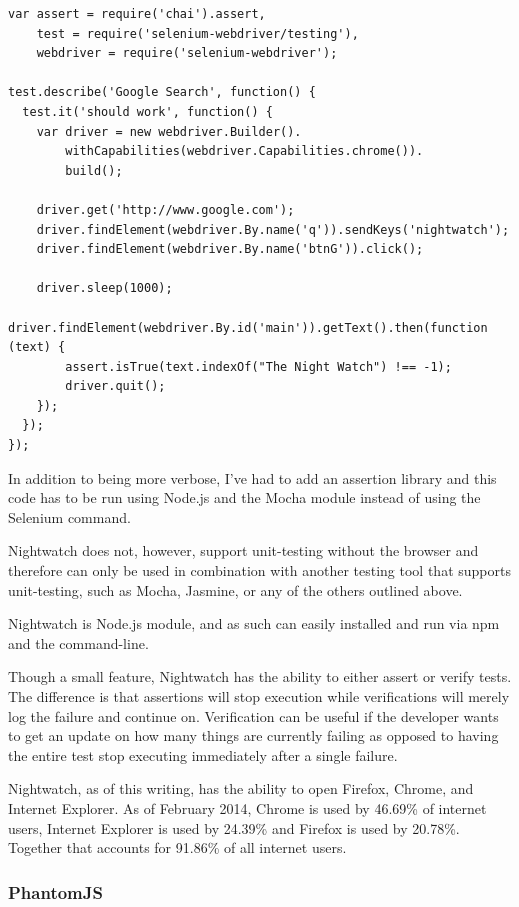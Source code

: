 \documentclass[11pt]{article}
\begin{document}
\begin{lstlisting}
var assert = require('chai').assert,
    test = require('selenium-webdriver/testing'),
    webdriver = require('selenium-webdriver');

test.describe('Google Search', function() {
  test.it('should work', function() {
    var driver = new webdriver.Builder().
        withCapabilities(webdriver.Capabilities.chrome()).
        build();

    driver.get('http://www.google.com');
    driver.findElement(webdriver.By.name('q')).sendKeys('nightwatch');
    driver.findElement(webdriver.By.name('btnG')).click();

    driver.sleep(1000);
    driver.findElement(webdriver.By.id('main')).getText().then(function (text) {
        assert.isTrue(text.indexOf("The Night Watch") !== -1);
        driver.quit();
    });
  });
});
\end{lstlisting}

In addition to being more verbose, I've had to add an assertion library and this code has to be run using Node.js and the Mocha module instead of using the Selenium command.

Nightwatch does not, however, support unit-testing without the browser and therefore can only be used in combination with another testing tool that supports unit-testing, such as Mocha, Jasmine, or any of the others outlined above.

Nightwatch is Node.js module, and as such can easily installed and run via npm and the command-line.

Though a small feature, Nightwatch has the ability to either assert or verify tests. The difference is that assertions will stop execution while verifications will merely log the failure and continue on. Verification can be useful if the developer wants to get an update on how many things are currently failing as opposed to having the entire test stop executing immediately after a single failure.

Nightwatch, as of this writing, has the ability to open Firefox, Chrome, and Internet Explorer. As of February 2014, Chrome is used by 46.69\% of internet users, Internet Explorer is used by 24.39\% and Firefox is used by 20.78\%.\cite{BrowserStats} Together that accounts for 91.86\% of all internet users.

\subsubsection{PhantomJS\cite{PhantomJS}}
\end{document}

